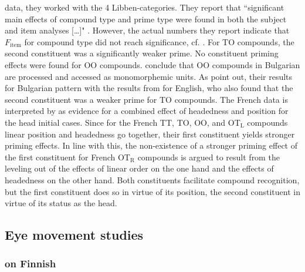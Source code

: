 data, they worked with the 4 Libben-categories. They
report that ``significant main effects of compound type and
prime type were found in both the subject and item analyses [\dots]"
\citet[367]{Jaremaetal:1999}. However, the actual numbers they report
indicate that $F_{\text{item}}$ for compound type did not reach significance,
cf. \citet[367]{Jaremaetal:1999}. For TO compounds, the second
constituent was a significantly weaker prime. No constituent priming
effects were found for  OO compounds. \citet[367]{Jaremaetal:1999} conclude that OO
compounds in Bulgarian are processed and accessed as monomorphemic
units. As \citet{Jaremaetal:1999} point out, their results for
Bulgarian pattern with the results from \citet{Libbenetal:2003} for
English, who also found that the second constituent was a weaker prime
for TO compounds. The
French data is interpreted by \citet[367]{Jaremaetal:1999} as evidence for a combined effect of
headedness and position for the head initial cases. Since for the
French TT, TO, OO, and OT$_{\text{L}}$ compounds linear position and headedness
go together, their first constituent yields stronger priming
effects. In line with this, the non-existence of a
stronger priming effect of the first constituent for
French OT$_{\text{R}}$ compounds is argued to result from the
leveling out of the effects of linear order on the one hand and the
effects of headedness on the other hand. Both constituents facilitate
compound recognition, but the first constituent does so in
virtue of its position, the second constituent in virtue of its status
as the head. 

\subsection{Eye movement studies}
\label{sec:eye-movement}

\subsubsection{\citet{PollatsekandHyona:2005} on Finnish}

